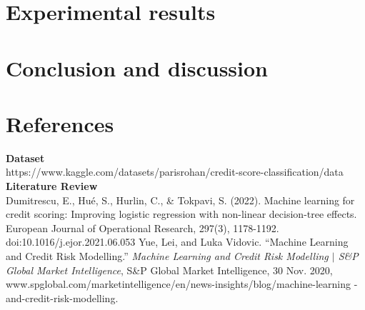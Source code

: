 \documentclass{article}
\begin{document}
\section*{Experimental results}

\newpage
\section*{Conclusion and discussion}

\newpage
\section*{References}
\textbf{Dataset}\\
https://www.kaggle.com/datasets/parisrohan/credit-score-classification/data
\vspace{5mm}\newline
\textbf{Literature Review}\\
Dumitrescu, E., Hué, S., Hurlin, C., \& Tokpavi, S. (2022). 
Machine learning for credit scoring: Improving logistic regression 
with non-linear decision-tree effects. European Journal of Operational 
Research, 297(3), 1178-1192. doi:10.1016/j.ejor.2021.06.053
\vspace{5mm}\newline
Yue, Lei, and Luka Vidovic. “Machine Learning and Credit Risk Modelling.”
 \textit{Machine Learning and Credit Risk Modelling $\vert$ S\&P Global Market Intelligence}, 
 S\&P Global Market Intelligence, 30 Nov. 2020, 
 www.spglobal.com/marketintelligence/en/news-insights/blog/machine-learning
 -and-credit-risk-modelling. 
\end{document}
